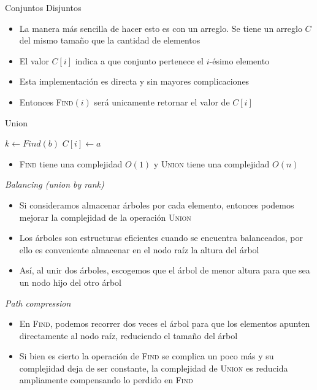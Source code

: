 \documentclass[handout]{beamer}
\begin{document}
\begin{frame}{Conjuntos Disjuntos}
  \begin{itemize}
    \item La manera m\'as sencilla de hacer esto es con un arreglo. Se tiene un arreglo $C$ del mismo tama\~no que la cantidad de elementos
      \pause
    \item El valor $C[i]$ indica a que conjunto pertenece el $i$-\'esimo elemento
      \pause
    \item Esta implementaci\'on es directa y sin mayores complicaciones
      \pause
    \item Entonces \textsc{Find}$(i)$ ser\'a unicamente retornar el valor de $C[i]$
  \end{itemize}
\end{frame}

\begin{frame}{Union}
  \begin{algorithm}[H]
    \BlankLine
    $k \leftarrow Find(b)$ \;
    {
      {
        $C[i] \leftarrow a$
      }
    }
    \BlankLine
  \end{algorithm}
  \pause
  \begin{itemize}
    \item \textsc{Find} tiene una complejidad $O(1)$ y \textsc{Union} tiene una complejidad $O(n)$
  \end{itemize}
\end{frame}

\begin{frame}{\textit{Balancing (union by rank)}}
  \begin{itemize}
    \item Si consideramos almacenar \'arboles por cada elemento, entonces podemos mejorar la complejidad de la operaci\'on \textsc{Union}
      \pause
    \item Los \'arboles son estructuras eficientes cuando se encuentra balanceados, por ello es conveniente almacenar en el nodo ra\'iz la altura del \'arbol
      \pause
    \item As\'i, al unir dos \'arboles, escogemos que el \'arbol de menor altura para que sea un nodo hijo del otro \'arbol
  \end{itemize}
\end{frame}

\begin{frame}{\textit{Path compression}}
  \begin{itemize}
    \item En \textsc{Find}, podemos recorrer dos veces el \'arbol para que los elementos apunten directamente al nodo ra\'iz, reduciendo el tama\~no del \'arbol
      \pause
    \item Si bien es cierto la operaci\'on de \textsc{Find} se complica un poco m\'as y su complejidad deja de ser constante, la complejidad de \textsc{Union} es reducida ampliamente compensando lo perdido en \textsc{Find}
  \end{itemize}
\end{frame}
\end{document}
